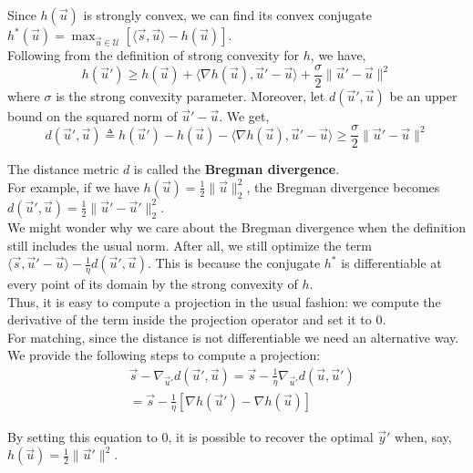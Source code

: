 \documentclass{article}
\begin{document}
Since $h(\vec u)$ is strongly convex, we can find its convex conjugate $h^*(\vec u) = \max_{\vec u  \in \mathcal{U}} \left [ \langle \vec s, \vec u \rangle - h(\vec u) \right ]$.\\
Following from the definition of strong convexity for $h$, we have,
\begin{equation}
  h(\vec u') \geq h(\vec u) + \langle \nabla h(\vec u), \vec u'  - \vec u \rangle + \frac{\sigma}{2} \lVert \vec u' - \vec u \rVert^2
\end{equation}
where $\sigma$ is the strong convexity parameter. Moreover, let $d(\vec u', \vec u)$ be an upper bound on the squared norm of $\vec u' - \vec u$. We get,
\begin{equation}
  d(\vec u', \vec u) \triangleq h(\vec u') - h(\vec u) - \langle \nabla h(\vec u), \vec u' - \vec u \rangle \geq \frac{\sigma}{2} \lVert \vec u' - \vec u \rVert^2
\end{equation}

The distance metric $d$ is called the \textbf{Bregman divergence}.\\ For example, if we have $h(\vec u) = \frac{1}{2} \lVert \vec u \rVert_2^2 $, the Bregman divergence becomes $d(\vec u', \vec u) = \frac{1}{2} \lVert \vec u' - \vec u' \rVert_2^2$.\\
We might wonder why we care about the Bregman divergence when the definition still includes the usual norm. After all, we still optimize the term $\langle \vec s, \vec u' - \vec u \rangle - \frac{1}{\eta} d(\vec u', \vec  u)$. This is because the conjugate $h^{*}$ is differentiable at every point of its domain by the strong convexity of $h$.\\
Thus, it is easy to compute a projection in the usual fashion: we compute the derivative of the term inside the projection operator and set it to 0.\\
For matching, since the distance is not differentiable we need an alternative way. We provide the following steps to compute a projection: 
\begin{equation}
\begin{aligned}
  &\vec s - \nabla_{\vec u'} d(\vec u', \vec u) = \vec s - \frac{1}{\eta} \nabla_{\vec u'} d(\vec u, \vec u')\\
  &= \vec s - \frac{1}{\eta} \left [\nabla h(\vec u') - \nabla h(\vec u) \right]
\end{aligned}
\end{equation}

By setting this equation to 0, it is possible to recover the optimal $\vec y'$ when, say, \quad $h(\vec u) = \frac{1}{2} \lVert \vec u' \rVert^2$. 
\end{document}
